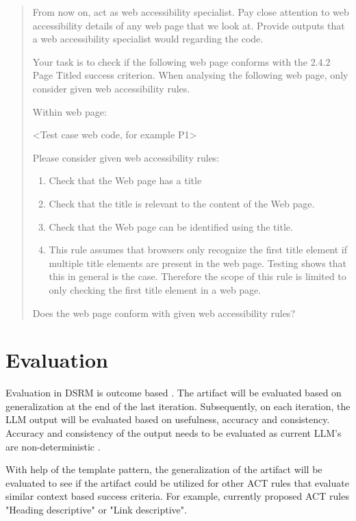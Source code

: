 \begin{quote}
From now on, act as web accessibility specialist. Pay close attention to web accessibility details of any web page that we look at. Provide outputs that a web accessibility specialist would regarding the code.

Your task is to check if the following web page conforms with the 2.4.2 Page Titled success criterion.
When analysing the following web page, only consider given web accessibility rules.

Within web page:

<Test case web code, for example P1>

Please consider given web accessibility rules:

\begin{enumerate}
    \item Check that the Web page has a title
    \item Check that the title is relevant to the content of the Web page.
    \item Check that the Web page can be identified using the title.
    \item This rule assumes that browsers only recognize the first title element if multiple title elements are present in the web page. Testing shows that this in general is the case. Therefore the scope of this rule is limited to only checking the first title element in a web page.
\end{enumerate}

Does the web page conform with given web accessibility rules?
\end{quote}

\section{Evaluation}

Evaluation in DSRM is outcome based \citep{design_science_eval}. The artifact will be evaluated based on generalization at the end of the last iteration. Subsequently, on each iteration, the LLM output will be evaluated based on usefulness, accuracy and consistency. Accuracy and consistency of the output needs to be evaluated as current LLM's are non-deterministic \citep{ouyang2023llm, power_determinism}.

With help of the template pattern, the generalization of the artifact will be evaluated to see if the artifact could be utilized for other ACT rules that evaluate similar context based success criteria. For example, currently proposed ACT rules "Heading descriptive" or "Link descriptive".

